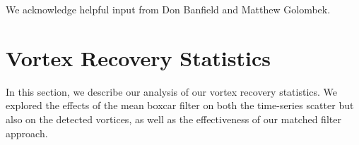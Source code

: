 \documentclass{aastex63}
\begin{document}



\acknowledgments

We acknowledge helpful input from Don Banfield and Matthew Golombek.

%

\vspace{5mm}
\facilities{}


\software{}



\appendix

\section{Vortex Recovery Statistics}
\label{sec:Vortex Recovery Statistics}
In this section, we describe our analysis of our vortex recovery statistics. We explored the effects of the mean boxcar filter on both the time-series scatter but also on the detected vortices, as well as the effectiveness of our matched filter approach.
\end{document}
